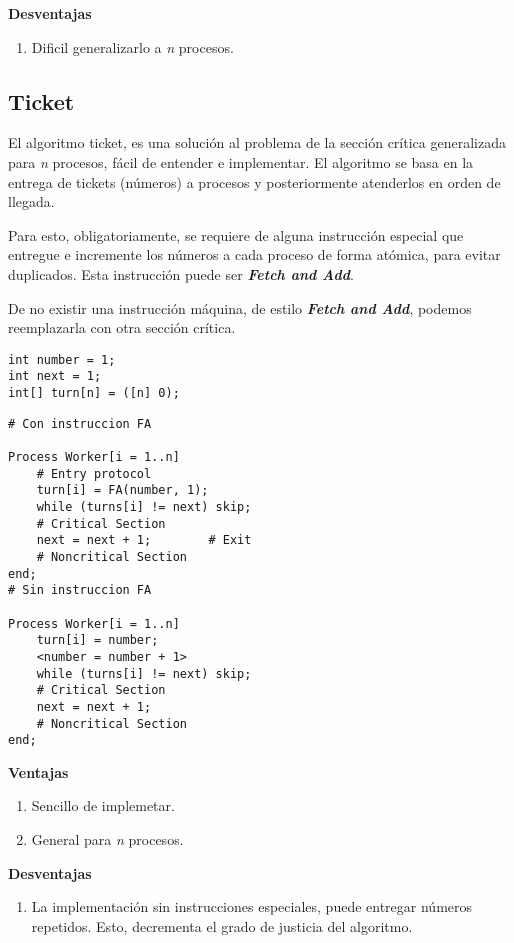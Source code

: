 \documentclass[a4paper, 10pt]{report}
\begin{document}
\textbf{Desventajas}
\begin{enumerate}
	\item Dificil generalizarlo a \emph{n} procesos.
\end{enumerate}

\subsection{Ticket}

El algoritmo ticket, es una solución al problema de la sección crítica generalizada para \emph{n} procesos, fácil de entender e implementar. El algoritmo se basa en la entrega de tickets (números) a procesos y posteriormente atenderlos en orden de llegada.

Para esto, obligatoriamente, se requiere de alguna instrucción especial que entregue e incremente los números a cada proceso de forma atómica, para evitar duplicados. Esta instrucción puede ser \textbf{\emph{Fetch and Add}}. 

De no existir una instrucción máquina, de estilo \textbf{\emph{Fetch and Add}}, podemos reemplazarla con otra sección crítica.

\begin{lstlisting}
int number = 1;
int	next = 1; 
int[] turn[n] = ([n] 0);
\end{lstlisting}

\begin{lstlisting}[firstnumber=4, multicols=2]
# Con instruccion FA

Process Worker[i = 1..n]
	# Entry protocol
	turn[i] = FA(number, 1);
	while (turns[i] != next) skip;	
	# Critical Section
	next = next + 1;        # Exit
	# Noncritical Section
end;
# Sin instruccion FA

Process Worker[i = 1..n]
	turn[i] = number;
	<number = number + 1>
	while (turns[i] != next) skip;
	# Critical Section
	next = next + 1;
	# Noncritical Section
end;
\end{lstlisting}

\textbf{Ventajas}
\begin{enumerate}
	\item Sencillo de implemetar.
	\item General para \emph{n} procesos.
\end{enumerate}

\textbf{Desventajas}
\begin{enumerate}
	\item La implementación sin instrucciones especiales, puede entregar números repetidos. Esto, decrementa el grado de justicia del algoritmo.
\end{enumerate}
\end{document}
